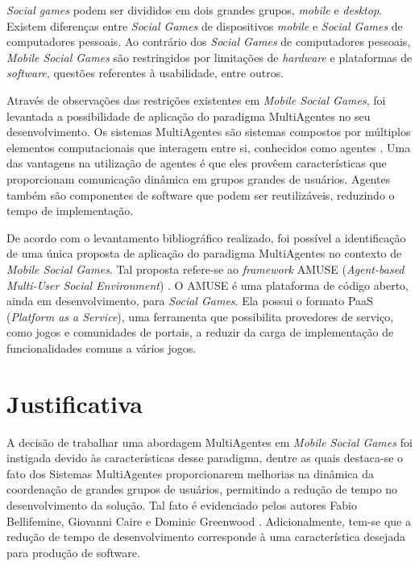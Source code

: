 \textit{Social games} podem ser divididos em dois grandes grupos, \textit{mobile} e \textit{desktop}. Existem diferen\c{c}as entre \textit{Social Games} de dispositivos \textit{mobile} e \textit{Social Games} de computadores pessoais.
Ao contrário dos \textit{Social Games} de computadores pessoais, \textit{Mobile Social Games} são restringidos por limita\c{c}\~oes de \textit{hardware} e plataformas de \textit{software}, questões
referentes à usabilidade, entre outros\cite{yamakani2011}.

Através de observações das restrições existentes em \textit{Mobile Social Games}, foi levantada a possibilidade de aplicação do paradigma MultiAgentes
no seu desenvolvimento. Os sistemas MultiAgentes são sistemas
compostos por múltiplos elementos computacionais que interagem entre si, conhecidos como agentes \cite{wooldridge2009}.
Uma das vantagens na utilização de agentes é que eles provêem características que proporcionam comunicação dinâmica em
grupos grandes de usuários\cite{bergenti2015}. Agentes também são componentes de software que podem ser reutilizáveis, reduzindo o tempo de
implementação\cite{bergentiHuhns2014}.

De acordo com o levantamento bibliográfico realizado, foi possível a identificação de uma única proposta de aplicação do paradigma MultiAgentes no contexto de \textit{Mobile Social Games}. Tal proposta refere-se ao \textit{framework} AMUSE (\textit{Agent-based Multi-User Social Environment})
\cite{amuse}. O AMUSE é uma plataforma de código aberto, ainda em desenvolvimento, para \textit{Social Games}.
Ela possui o formato PaaS (\textit{Platform as a Service})\cite{bergenti2015}, uma ferramenta que possibilita provedores de serviço,
como jogos e comunidades de portais, a reduzir da carga de implementação de funcionalidades
comuns a vários jogos\cite{bergenti2015}.

\section{Justificativa}

A decisão de trabalhar uma abordagem MultiAgentes em \textit{Mobile Social Games} foi instigada devido às características desse paradigma,
dentre as quais destaca-se o fato dos Sistemas MultiAgentes proporcionarem melhorias na dinâmica da coordenação de grandes grupos
de usuários, permitindo a redução de tempo no desenvolvimento da solução. Tal fato é evidenciado pelos autores Fabio Bellifemine, Giovanni Caire e Dominic Greenwood
\cite{fabio2007}. Adicionalmente, tem-se que a redução de tempo de
desenvolvimento corresponde à uma característica desejada para produção de
software\cite{bergenti2015}.

